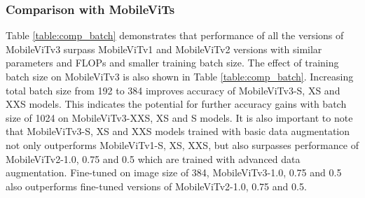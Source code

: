 \documentclass{article} \usepackage{iclr2022_conference,times}
\begin{document}
\subsubsection{Comparison with MobileViTs}
Table \ref{table:comp_batch} demonstrates that performance of all the versions of MobileViTv3 surpass MobileViTv1 and MobileViTv2 versions with similar parameters and FLOPs and smaller training batch size. 
The effect of training batch size on MobileViTv3 is also shown in Table \ref{table:comp_batch}.
Increasing total batch size from 192 to 384 improves accuracy of MobileViTv3-S, XS and XXS models. 
This indicates the potential for further accuracy gains with batch size of 1024 on MobileViTv3-XXS, XS and S models. 
It is also important to note that MobileViTv3-S, XS and XXS models trained with basic data augmentation not only outperforms MobileViTv1-S, XS, XXS, but also surpasses performance of MobileViTv2-1.0, 0.75 and 0.5 which are trained with advanced data augmentation. 
Fine-tuned on image size of 384, MobileViTv3-1.0, 0.75 and 0.5 also outperforms fine-tuned versions of MobileViTv2-1.0, 0.75 and 0.5. 
\end{document}
